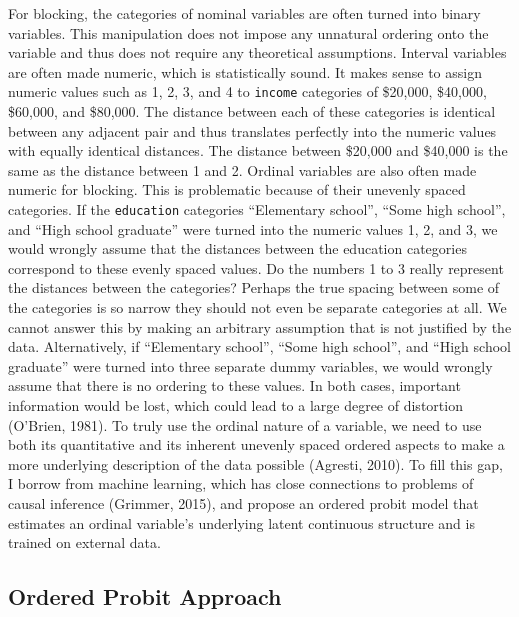 \documentclass[12pt,econ]{sources/authesis}
\begin{document}
For blocking, the categories of nominal variables are often turned into binary variables. This manipulation does not impose any unnatural ordering onto the variable and thus does not require any theoretical assumptions. Interval variables are often made numeric, which is statistically sound. It makes sense to assign numeric values such as 1, 2, 3, and 4 to \texttt{income} categories of \$20,000, \$40,000, \$60,000, and \$80,000. The distance between each of these categories is identical between any adjacent pair and thus translates perfectly into the numeric values with equally identical distances. The distance between \$20,000 and \$40,000 is the same as the distance between 1 and 2. Ordinal variables are also often made numeric for blocking. This is problematic because of their unevenly spaced categories. If the \texttt{education} categories ``Elementary school'', ``Some high school'', and ``High school graduate'' were turned into the numeric values 1, 2, and 3, we would wrongly assume that the distances between the education categories correspond to these evenly spaced values. Do the numbers 1 to 3 really represent the distances between the categories? Perhaps the true spacing between some of the categories is so narrow they should not even be separate categories at all. We cannot answer this by making an arbitrary assumption that is not justified by the data. Alternatively, if ``Elementary school'', ``Some high school'', and ``High school graduate'' were turned into three separate dummy variables, we would wrongly assume that there is no ordering to these values. In both cases, important information would be lost, which could lead to a large degree of distortion (O'Brien, 1981). To truly use the ordinal nature of a variable, we need to use both its quantitative and its inherent unevenly spaced ordered aspects to make a more underlying description of the data possible (Agresti, 2010). To fill this gap, I borrow from machine learning, which has close connections to problems of causal inference (Grimmer, 2015), and propose an ordered probit model that estimates an ordinal variable's underlying latent continuous structure and is trained on external data.

\hypertarget{ordblock-theory-op}{%
\subsection{Ordered Probit Approach}\label{ordblock-theory-op}}
\end{document}
